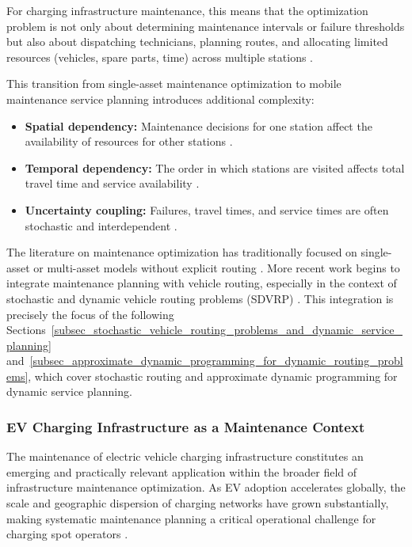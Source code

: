 \documentclass[12pt,oneside]{article}
\begin{document}
For charging infrastructure maintenance, this means that the optimization problem is not only about
determining maintenance intervals or failure thresholds but also about dispatching technicians,
planning routes, and allocating limited resources (vehicles, spare parts, time) across multiple
stations \citep{dejonge2020review}.

This transition from single-asset maintenance optimization to mobile maintenance service planning
introduces additional complexity:
\begin{itemize}
  \setlength{\itemsep}{4pt}
  \item \textbf{Spatial dependency:} Maintenance decisions for one station affect the availability of resources for other stations \citep{dejonge2020review}.
    \item \textbf{Temporal dependency:} The order in which stations are visited affects total travel time and service availability \citep{alaswad2017review}.
    \item \textbf{Uncertainty coupling:} Failures, travel times, and service times are often stochastic and interdependent \citep{dejonge2020review}.
\end{itemize}
The literature on maintenance optimization has traditionally focused on single-asset or multi-asset
models without explicit routing \citep{dejonge2020review}.
More recent work begins to integrate maintenance planning with vehicle routing, especially in the
context of stochastic and dynamic vehicle routing problems (SDVRP) \citep{dejonge2020review}.
This integration is precisely the focus of the following Sections~\ref{subsec_stochastic_vehicle_routing_problems_and_dynamic_service_planning} and~\ref{subsec_approximate_dynamic_programming_for_dynamic_routing_problems}, which cover
stochastic routing and approximate dynamic programming for dynamic service planning.


\subsubsection{EV Charging Infrastructure as a Maintenance Context}
The maintenance of electric vehicle charging infrastructure constitutes an emerging and practically relevant application within the broader field of infrastructure maintenance optimization. As EV adoption accelerates globally, the scale and geographic dispersion of charging networks have grown substantially, making systematic maintenance planning a critical operational challenge for charging spot operators \citep{zhang2024routing}.
\end{document}
